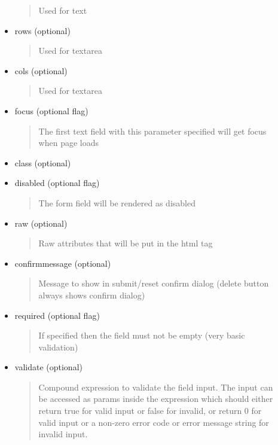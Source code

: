 \documentclass[letterpaper,10pt,english]{sphinxmanual}
\begin{document}
\begin{fulllineitems}
\begin{fulllineitems}
\begin{description}
\begin{itemize}
\begin{quote}
Used for text
\end{quote}

\item {} 
rows (optional)
\begin{quote}

Used for textarea
\end{quote}

\item {} 
cols (optional)
\begin{quote}

Used for textarea
\end{quote}

\item {} 
focus (optional flag)
\begin{quote}

The first text field with this parameter specified will get focus
when page loads
\end{quote}

\item {} 
class (optional)

\item {} 
disabled (optional flag)
\begin{quote}

The form field will be rendered as disabled
\end{quote}

\item {} 
raw (optional)
\begin{quote}

Raw attributes that will be put in the html tag
\end{quote}

\item {} 
confirmmessage (optional)
\begin{quote}

Message to show in submit/reset confirm dialog (delete button always
shows confirm dialog)
\end{quote}

\item {} 
required (optional flag)
\begin{quote}

If specified then the field must not be empty (very basic validation)
\end{quote}

\item {} 
validate (optional)
\begin{quote}

Compound expression to validate the field input. The input can be
accessed as params inside the expression which should either return
true for valid input or false for invalid, or return 0 for valid
input or a non-zero error code or error message string for invalid
input.
\end{quote}


\end{itemize}
\end{description}
\end{fulllineitems}
\end{fulllineitems}
\end{document}
